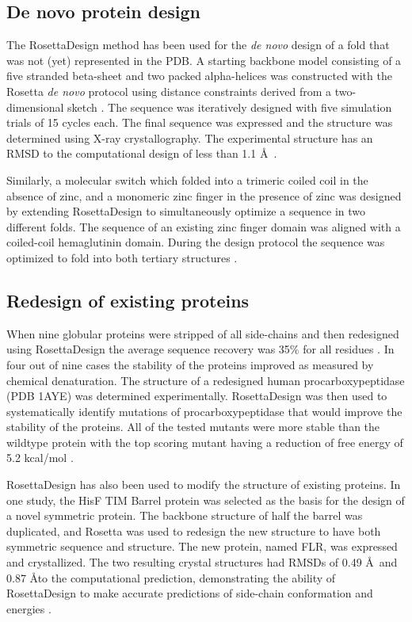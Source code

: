 \subsection{De novo protein design}

The RosettaDesign method has been used for the \textit{de novo} design of a fold that was not (yet) represented in the \ac{PDB}.
A starting backbone model consisting of a five stranded beta-sheet and two packed alpha-helices was constructed with the Rosetta \textit{de novo} protocol using distance constraints derived from a two-dimensional sketch  \citep{Rohl:2004dh}.
The sequence was iteratively designed with five simulation trials of 15 cycles each.
The final sequence was expressed and the structure was determined using X-ray crystallography.
The experimental structure has an \ac{RMSD} to the computational design of less than 1.1 \AA\  \citep{Kuhlman:2003kp}.

Similarly, a molecular switch which folded into a trimeric coiled coil in the absence of zinc, and a monomeric zinc finger in the presence of zinc was designed by extending RosettaDesign to simultaneously optimize a sequence in two different folds.
The sequence of an existing zinc finger domain was aligned with a coiled-coil hemaglutinin domain.
During the design protocol the sequence was optimized to fold into both tertiary structures  \citep{Ambroggio:2006he}.

\subsection{Redesign of existing proteins}
When nine globular proteins were stripped of all side-chains and then redesigned using RosettaDesign the average sequence recovery was 35\% for all residues  \citep{Kuhlman:2003kp}.
In four out of nine cases the stability of the proteins improved as measured by chemical denaturation.
The structure of a redesigned human procarboxypeptidase (\ac{PDB} 1AYE)  \citep{GarciaSaez:1997cn} was determined experimentally.
RosettaDesign was then used to systematically identify mutations of procarboxypeptidase that would improve the stability of the proteins.
All of the tested mutants were more stable than the wildtype protein with the top scoring mutant having a reduction of free energy of 5.2 kcal/mol  \citep{Dantas:2007iq}.

RosettaDesign has also been used to modify the structure of existing proteins.
In one study, the HisF TIM Barrel protein was selected as the basis for the design of a novel symmetric protein.
The backbone structure of half the barrel was duplicated, and Rosetta was used to redesign the new structure to have both symmetric sequence and structure.
The new protein, named FLR, was expressed and crystallized.
The two resulting crystal structures had RMSDs of 0.49 \AA\ and 0.87 \AA to the computational prediction, demonstrating the ability of RosettaDesign to make accurate predictions of side-chain conformation and energies  \citep{Fortenberry:2011hw}.

